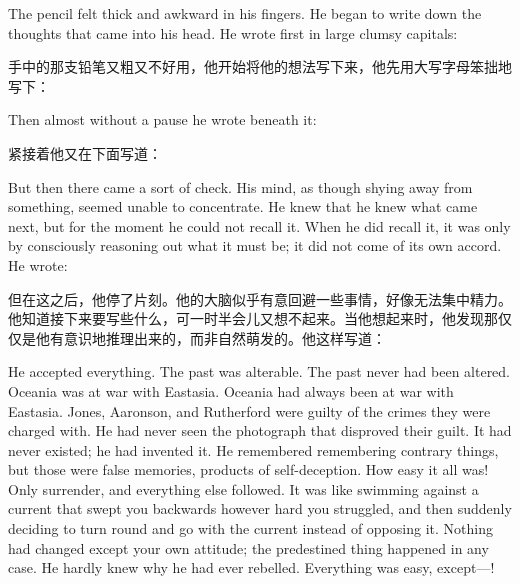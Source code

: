 \begin{paracol}{2}
\switchcolumn*

The pencil felt thick and awkward in his fingers. He began to write down
the thoughts that came into his head. He wrote first in large clumsy
capitals:

\switchcolumn

手中的那支铅笔又粗又不好用，他开始将他的想法写下来，他先用大写字母笨拙地写下：

\switchcolumn*


\switchcolumn


\switchcolumn*

Then almost without a pause he wrote beneath it:

\switchcolumn

紧接着他又在下面写道：

\switchcolumn*


\switchcolumn


\switchcolumn*

But then there came a sort of check. His mind, as though shying away
from something, seemed unable to concentrate. He knew that he knew what
came next, but for the moment he could not recall it. When he did recall
it, it was only by consciously reasoning out what it must be; it did not
come of its own accord. He wrote:

\switchcolumn

但在这之后，他停了片刻。他的大脑似乎有意回避一些事情，好像无法集中精力。他知道接下来要写些什么，可一时半会儿又想不起来。当他想起来时，他发现那仅仅是他有意识地推理出来的，而非自然萌发的。他这样写道：

\switchcolumn*


\switchcolumn


\switchcolumn*

He accepted everything. The past was alterable. The past never had been
altered. Oceania was at war with Eastasia. Oceania had always been at
war with Eastasia. Jones, Aaronson, and Rutherford were guilty of the
crimes they were charged with. He had never seen the photograph that
disproved their guilt. It had never existed; he had invented it. He
remembered remembering contrary things, but those were false memories,
products of self-deception. How easy it all was! Only surrender, and
everything else followed. It was like swimming against a current that
swept you backwards however hard you struggled, and then suddenly
deciding to turn round and go with the current instead of opposing it.
Nothing had changed except your own attitude; the predestined thing
happened in any case. He hardly knew why he had ever rebelled.
Everything was easy, except---!


\end{paracol}
